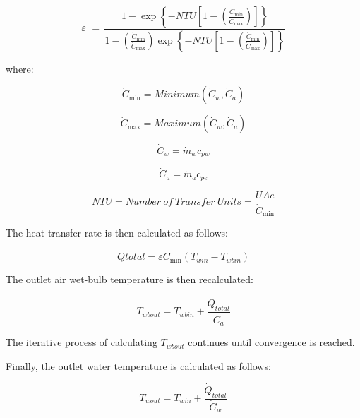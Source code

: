 \begin{equation}
\varepsilon \,\, = \,\frac{{1 - \exp \left\{ { - NTU\left[ {1 - \left( {\frac{{{{\dot C}_{\min }}}}{{{{\dot C}_{\max }}}}} \right)} \right]} \right\}}}{{1 - \left( {\frac{{{{\dot C}_{\min }}}}{{{{\dot C}_{\max }}}}} \right)\exp \left\{ { - NTU\left[ {1 - \left( {\frac{{{{\dot C}_{\min }}}}{{{{\dot C}_{\max }}}}} \right)} \right]} \right\}}}
\end{equation}

where:

\begin{equation}
{\dot C_{\min }} = Minimum({\dot C_w},{\dot C_a})
\end{equation}

\begin{equation}
{\dot C_{\max }} = Maximum({\dot C_w},{\dot C_a})
\end{equation}

\begin{equation}
{\dot C_w} = {\dot m_w}c_{pw}
\end{equation}

\begin{equation}
{\dot C_a} = {\dot m_a}\bar c_{pe}
\end{equation}

\begin{equation}
NTU = Number~of~Transfer~Units = \frac{{UAe}}{{{{\dot C}_{\min }}}}
\end{equation}

The heat transfer rate is then calculated as follows:

\begin{equation}
\dot Qtotal = \varepsilon {\dot C_{\min }}\left( {T_{win} - T_{wbin}} \right)
\end{equation}

The outlet air wet-bulb temperature is then recalculated:

\begin{equation}
{T_{wbout}} = {T_{wbin}} + \frac{{{{\dot Q}_{total}}}}{{{{\dot C}_a}}}
\end{equation}

The iterative process of calculating \({T_{wbout}}\) continues until convergence is reached.

Finally, the outlet water temperature is calculated as follows:

\begin{equation}
{T_{wout}} = {T_{win}} + \frac{{{{\dot Q}_{total}}}}{{{{\dot C}_w}}}
\end{equation}

